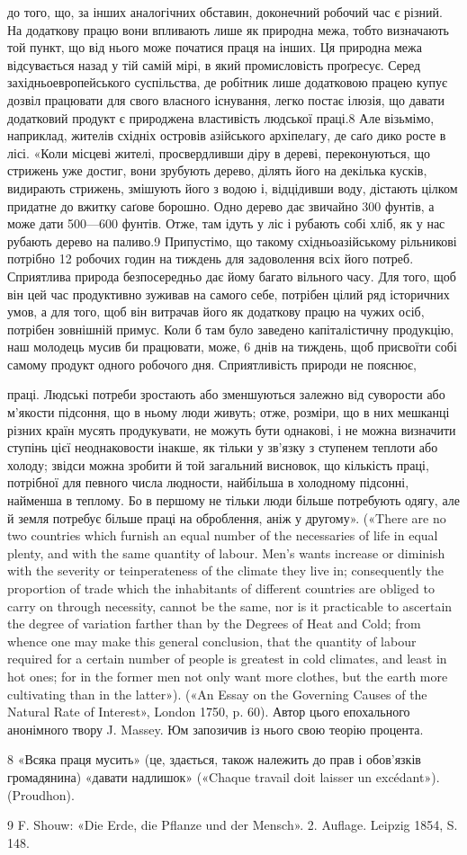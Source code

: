 до того, що, за інших аналогічних обставин, доконечний робочий
час є різний. На додаткову працю вони впливають лише як
природна межа, тобто визначають той пункт, що від нього може
початися праця на інших. Ця природна межа відсувається назад
у тій самій мірі, в який промисловість проґресує. Серед західньоевропейського
суспільства, де робітник лише додатковою працею
купує дозвіл працювати для свого власного існування, легко
постає ілюзія, що давати додатковий продукт є природжена властивість
людської праці.8 Але візьмімо, наприклад, жителів
східніх островів азійського архіпелагу, де саґо дико росте в лісі.
«Коли місцеві жителі, просвердливши діру в дереві, переконуються,
що стрижень уже достиг, вони зрубують дерево, ділять
його на декілька кусків, видирають стрижень, змішують його
з водою і, відцідивши воду, дістають цілком придатне до вжитку
саґове борошно. Одно дерево дає звичайно 300 фунтів, а може
дати 500—600 фунтів. Отже, там ідуть у ліс і рубають собі хліб,
як у нас рубають дерево на паливо.9 Припустімо, що такому
східньоазійському рільникові потрібно 12 робочих годин на
тиждень для задоволення всіх його потреб. Сприятлива природа
безпосередньо дає йому багато вільного часу. Для того, щоб він
цей час продуктивно зуживав на самого себе, потрібен цілий ряд
історичних умов, а для того, щоб він витрачав його як додаткову
працю на чужих осіб, потрібен зовнішній примус. Коли б там
було заведено капіталістичну продукцію, наш молодець мусив би
працювати, може, 6 днів на тиждень, щоб присвоїти собі самому
продукт одного робочого дня. Сприятливість природи не пояснює,

праці. Людські потреби зростають або зменшуються залежно від суворости
або м’якости підсоння, що в ньому люди живуть; отже, розміри, що в
них мешканці різних країн мусять продукувати, не можуть бути однакові,
і не можна визначити ступінь цієї неоднаковости інакше, як тільки у
зв’язку з ступенем теплоти або холоду; звідси можна зробити й той загальний
висновок, що кількість праці, потрібної для певного числа людности,
найбільша в холодному підсонні, найменша в теплому. Бо в першому
не тільки люди більше потребують одягу, але й земля потребує
більше праці на оброблення, аніж у другому». («There are no two countries
which furnish an equal number of the necessaries of life in equal plenty,
and with the same quantity of labour. Men’s wants increase or diminish
with the severity or teinperateness of the climate they live in; consequently
the proportion of trade which the inhabitants of different countries are
obliged to carry on through necessity, cannot be the same, nor is it practicable
to ascertain the degree of variation farther than by the Degrees of
Heat and Cold; from whence one may make this general conclusion, that
the quantity of labour required for a certain number of people is greatest
in cold climates, and least in hot ones; for in the former men not only want
more clothes, but the earth more cultivating than in the latter»). («An
Essay on the Governing Causes of the Natural Rate of Interest», London
1750, p. 60). Автор цього епохального анонімного твору J. Massey.
Юм запозичив із нього свою теорію процента.

8 «Всяка праця мусить» (це, здається, також належить до прав і
обов’язків громадянина) «давати надлишок» («Chaque travail doit
laisser un excédant»). (Proudhon).

9 F. Shouw: «Die Erde, die Pflanze und der Mensch». 2. Auflage. Leipzig
1854, S. 148.
